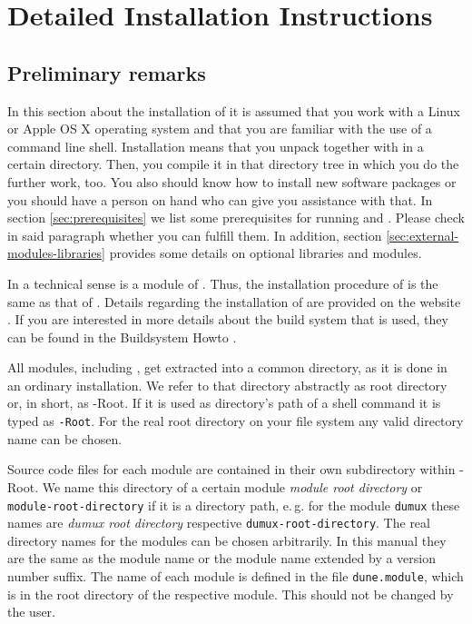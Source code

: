 \chapter{Detailed Installation Instructions} \label{install}

\section{Preliminary remarks}
In this section about the installation of \Dumux it is assumed that you work with a Linux or Apple OS X operating system
and that you are familiar with the use of a command line shell. Installation means that you unpack \Dune together with \Dumux in a certain directory.
Then, you compile it in that directory tree in which you do the further work, too. You also should know how to install new software packages
or you should have a person on hand who can give you assistance with that. In section \ref{sec:prerequisites} we list some prerequisites for running \Dune and \Dumux. 
Please check in said paragraph whether you can fulfill them. In addition, section \ref{sec:external-modules-libraries} provides some details on optional libraries and modules.

In a technical sense \Dumux is a module of \Dune. 
Thus, the installation procedure of \Dumux is the same as that of \Dune. 
Details regarding the installation of \Dune are provided on the \Dune website \cite{DUNE-INST}. 
If you are interested in more details about the build system that is used,
they can be found in the {\Dune} Buildsystem Howto \cite{DUNE-BS}.

All \Dune modules, including \Dumux, get extracted into a common directory, as it is done in an ordinary \Dune installation. 
We refer to that directory abstractly as {\Dune} root directory or, in short, as {\Dune}-Root. 
If it is used as directory's path of a shell command it is typed as \texttt{\Dune-Root}. 
For the real {\Dune} root directory on your file system any valid directory name can be chosen.

Source code files for each \Dune module are contained in their own subdirectory within {\Dune}-Root.
We name this directory of a certain module \emph{module root directory} or \texttt{module-root-directory} if it is a directory path,
e.\,g. for the module \texttt{dumux} these names are  \emph{dumux root directory} respective \texttt{dumux-root-directory}.
The real directory names for the modules can be chosen arbitrarily. In this manual they are the same as the
module name or the module name extended by a version number suffix.
The name of each \Dune module is defined in the file \texttt{dune.module}, which is in the root
directory of the respective module. This should not be changed by the user.

